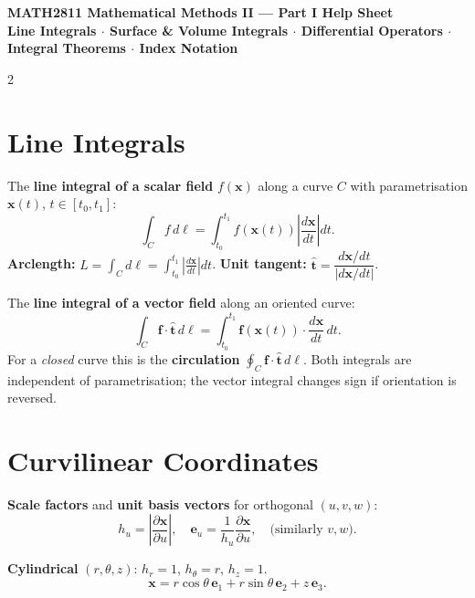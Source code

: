 \documentclass[10pt,a4paper]{article}
\newcommand{\kw}[1]{\textbf{#1}}
\newcommand{\p}[2]{\frac{\partial #1}{\partial #2}}      %
\newcommand{\hvt}{\hat{\mathbf{t}}}
\newcommand{\vx}{\mathbf{x}}
\newcommand{\vf}{\mathbf{f}}
\newcommand{\eu}{\mathbf{e}_u}
\begin{document}
\noindent\colorbox{headbg}{%
  \parbox{\linewidth}{%
    \vspace{6pt}
    \centering\color{headfg}\Large\bfseries
    MATH2811 Mathematical Methods II --- Part I Help Sheet\\[2pt]
    \normalsize
    Line Integrals $\cdot$ Surface \& Volume Integrals $\cdot$
    Differential Operators $\cdot$ Integral Theorems $\cdot$ Index Notation
    \vspace{6pt}
  }%
}

\vspace{4pt}
\begin{multicols}{2}

\section{Line Integrals}

\begin{defbox}
The \kw{line integral of a scalar field} $f(\vx)$ along a curve $C$
with parametrisation $\vx(t)$, $t\in[t_0,t_1]$:
\[
  \int_C f\,d\ell
  = \int_{t_0}^{t_1} f(\vx(t))\left|\frac{d\vx}{dt}\right|dt.
\]
\textbf{Arclength:}\;
$L=\displaystyle\int_C d\ell
 = \int_{t_0}^{t_1}\!\left|\tfrac{d\vx}{dt}\right|dt$.
\quad
\textbf{Unit tangent:}\;
$\hvt=\dfrac{d\vx/dt}{\left|d\vx/dt\right|}$.

The \kw{line integral of a vector field} along an oriented curve:
\[
  \int_C \vf\cdot\hvt\,d\ell
  = \int_{t_0}^{t_1}\vf(\vx(t))\cdot\frac{d\vx}{dt}\,dt.
\]
For a \emph{closed} curve this is the \kw{circulation}
$\oint_C \vf\cdot\hvt\,d\ell$.
Both integrals are independent of parametrisation;
the vector integral changes sign if orientation is reversed.
\end{defbox}

\section{Curvilinear Coordinates}

\begin{defbox}
\kw{Scale factors} and \kw{unit basis vectors} for orthogonal $(u,v,w)$:
\[
  h_u=\left|\p{\vx}{u}\right|,
  \quad
  \eu=\frac{1}{h_u}\p{\vx}{u},
  \quad\text{(similarly $v,w$).}
\]

\textbf{Cylindrical} $(r,\theta,z)$:
$h_r=1$, $h_\theta=r$, $h_z=1$.
\[
  \vx = r\cos\theta\,\mathbf{e}_1
      + r\sin\theta\,\mathbf{e}_2
      + z\,\mathbf{e}_3.
\]


\end{defbox}
\end{multicols}
\end{document}
